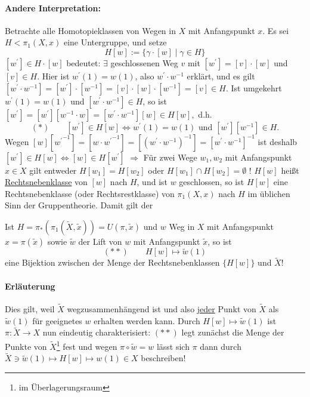 \documentclass[a4paper,11pt,notitlepage]{report}
\theoremstyle{definition}
\begin{document}
\paragraph{Andere Interpretation:}
Betrachte alle Homotopieklassen von Wegen in $X$ mit Anfangspunkt $x$. \newline
Es sei $H < \pi_1(X,x)$ eine Untergruppe, und setze
$$H[w] := \{\gamma \cdot [w] \mid \gamma \in H\}$$
$[w^\prime] \in H \cdot [w]$ bedeutet: $\exists$ geschlossenen Weg $v$ mit $[w^\prime] = [v] \cdot [w]$ und $[v] \in H$.
\newline
Hier ist $w^\prime(1) = w(1)$, also $w^\prime \cdot w^{-1}$ erklärt, und es gilt $[w^\prime \cdot w^{-1}] = [w^\prime] \cdot [w^{-1}] = [v] \cdot [w] \cdot [w^{-1}] = [v] \in H$.
\newline
Ist umgekehrt $w^\prime(1) = w(1)$ und $[w^\prime \cdot w^{-1}] \in H$, so ist $[w^\prime] = [w^\prime][w^{-1} \cdot w] = [w^\prime \cdot w^{-1}] [w] \in H [w],$ d.h.
$$(*) \qquad [w^\prime] \in H [w] \Leftrightarrow w^\prime(1) = w(1) \text{ und } [w^\prime][w^{-1}] \in H.$$
Wegen $[w][{w^\prime}^{-1}] = [w \cdot {w^\prime}^{-1}] = [(w^\prime \cdot w^{-1})^{-1}] = [w^\prime \cdot w^{-1}]^{-1}$ ist deshalb $[w^\prime] \in H [w] \Leftrightarrow [w] \in H [w^\prime]$ \newline
$\Rightarrow$ Für zwei Wege $w_1, w_2$ mit Anfangspunkt $x \in X$ gilt entweder $H[w_1] = H[w_2]$ oder $H[w_1] \cap H[w_2] = \emptyset$ !
\newline
$H[w]$ heißt \underline{Rechtsnebenklasse} von $[w]$ nach $H$, 
\newline
und ist $w$ geschlossen, so ist $H[w]$ eine Rechtsnebenklasse (oder Rechtsrestklasse) von $\pi_1(X,x)$ nach $H$ im üblichen Sinn der Gruppentheorie.  
\newline
Damit gilt der
\begin{theorem}
	Ist $H = \pi_*(\pi_1(\widetilde{X}, \widetilde{x})) = U(\pi, \widetilde{x})$ und $w$ Weg in $X$ mit Anfangspunkt $x = \pi(\widetilde{x})$ sowie $\widetilde{w}$ der Lift von $w$ mit Anfangspunkt $\widetilde{x}$, so ist 
	$$(**) \qquad H[w] \mapsto \widetilde{w}(1)$$
	eine Bijektion zwischen der Menge der Rechtsnebenklassen $\{H [w]\}$ und $\widetilde{X}$!
\end{theorem}

\paragraph{Erläuterung}
Dies gilt, weil $\widetilde{X}$ wegzusammenhängend ist und also \underline{jeder} Punkt von $\widetilde{X}$ als $\widetilde{w}(1)$ für geeignetes $w$ erhalten werden kann. Durch $H[w] \mapsto \widetilde{w}(1)$ ist $\pi \colon \widetilde{X} \rightarrow X$ nun eindeutig charakterisiert: $(**)$ legt zunächst die Menge der Punkte von $\widetilde{X}$\footnote{im Überlagerungsraum} fest und wegen $\pi \circ \widetilde{w} = w$ lässt sich $\pi$ dann durch $\widetilde{X} \ni \widetilde{w}(1) \mapsto H [w] \mapsto w(1) \in X$ beschreiben!
\end{document}
